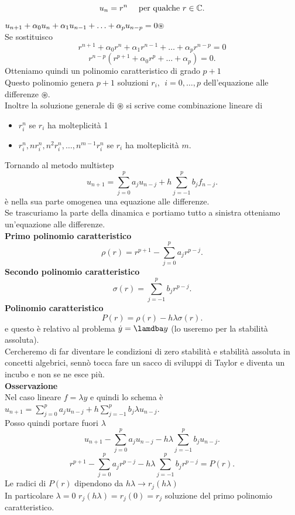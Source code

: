\documentclass[12px]{article}
\begin{document}
 \[
	 u_{n} = r^n \ \ \ \ \text{per qualche } r\in\mathbb{C}
.\] 
$u_{n+1} + \alpha_0 u_n+ \alpha_1 u_{n-1} + \ldots + \alpha_p u_{n-p}=0 \hfill \circledast$\\
Se sostituisco 
\[
	r^{n+1} + \alpha_0 r^{n} + \alpha_1r^{n-1} + \ldots + \alpha_pr^{n-p} = 0
\] 
\[
	r^{n-p} (r^{p+1} + \alpha_0 r^{p} + \ldots + \alpha_p ) = 0
.\] 
Otteniamo quindi un polinomio caratteristico di grado $p+1$\\
Questo polinomio genera  $p+1$ soluzioni $r_i, \ \ i=0,\ldots, p$ dell'equazione alle differenze  $\circledast$.\\
Inoltre la soluzione generale di  $\circledast$ si scrive come combinazione lineare di 
\begin{itemize}
	\item $r_i^n$ se $r_i$ ha molteplicità 1
	\item $r_i^n, nr^n_i, n^2r^n_i,\ldots,n^{m-1}r^n_i$ se $r_i$ ha molteplicità $m$.
\end{itemize}
Tornando al metodo multistep 
\[
	u_{n+1} = \sum^{p}_{j=0}a_ju_{n-j} + h \sum^{p}_{j=-1}b_jf_{n-j}
.\] 
è nella sua parte omogenea una equazione alle differenze.\\
Se trascuriamo la parte della dinamica e portiamo tutto a sinistra otteniamo un'equazione alle differenze.\\
\textbf{Primo polinomio caratteristico}\\
\[
	\rho(r) = r^{p+1} - \sum^{p}_{j=0}a_jr^{p-j}
.\] 
\textbf{Secondo polinomio caratteristico }
\[
	\sigma(r) = \sum^{p}_{j=-1}b_jr^{p-j}
.\] 
\textbf{Polinomio caratteristico}
\[
P(r) = \rho(r) - h\lambda\sigma(r)
.\] 
e questo è relativo al problema $\dot y = \lamdba y $ (lo useremo per la stabilità assoluta).\\
Cercheremo di far diventare le condizioni di zero stabilità e stabilità assoluta in concetti algebrici, sennò tocca fare un sacco di sviluppi di Taylor e diventa un incubo e non se ne esce più.\\
\textbf{Osservazione}\\
Nel caso lineare $f = \lambda y$ e quindi lo schema è $u_{n+1} = \sum^{p}_{j=0}a_ju_{n-j} + h \sum^{p}_{j=-1}b_j\lambda u_{n-j}$.\\
Posso quindi portare fuori $\lambda$
 \[
	 u_{n+1} - \sum^{p}_{j=0}a_ju_{n-j} - h\lambda \sum^{p}_{j=-1}b_ju_{n-j}
.\] 
\[
	r^{p+1} - \sum^{p}_{j=0}a_j r^{p-j} - h\lambda \sum^{p}_{j=-1}b_jr^{p-j} = P(r)
.\] 
Le radici di $P(r)$ dipendono da  $h\lambda \rightarrow r_j(h\lambda)$ \\
In particolare $\lambda= 0$  $r_j(h\lambda) = r_j(0) = r_j$ soluzione del primo polinomio caratteristico.
\end{document}

